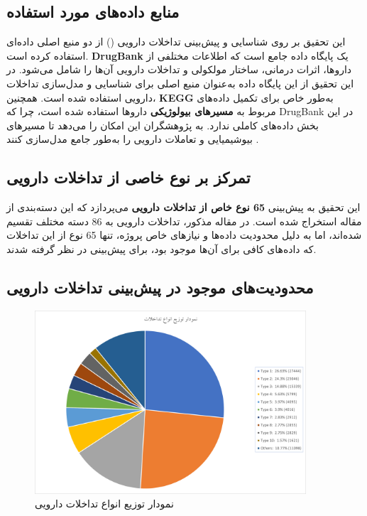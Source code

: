 \subsection{منابع داده‌های مورد استفاده}
این تحقیق بر روی شناسایی و پیش‌بینی تداخلات دارویی () از دو منبع اصلی داده‌ای استفاده کرده است. \textbf{DrugBank} یک پایگاه داده جامع است که اطلاعات مختلفی از داروها، اثرات درمانی، ساختار مولکولی و تداخلات دارویی آن‌ها را شامل می‌شود. در این تحقیق از این پایگاه داده به‌عنوان منبع اصلی برای شناسایی و مدل‌سازی تداخلات دارویی استفاده شده است. همچنین، \textbf{KEGG} به‌طور خاص برای تکمیل داده‌های مربوط به \textbf{مسیرهای بیولوژیکی} داروها استفاده شده است، چرا که DrugBank در این بخش داده‌های کاملی ندارد.  به پژوهشگران این امکان را می‌دهد تا مسیرهای بیوشیمیایی و تعاملات دارویی را به‌طور جامع مدل‌سازی کنند \cite{ref_drugbank, ref_kegg}.

\subsection{تمرکز بر نوع خاصی از تداخلات دارویی}
این تحقیق به پیش‌بینی \textbf{65 نوع خاص از تداخلات دارویی} می‌پردازد که این دسته‌بندی از مقاله \cite{ref_ryu2018} استخراج شده‌ است. در مقاله مذکور، تداخلات دارویی به 86 دسته مختلف تقسیم شده‌اند، اما به دلیل محدودیت داده‌ها و نیازهای خاص پروژه، تنها 65 نوع از این تداخلات که داده‌های کافی برای آن‌ها موجود بود، برای پیش‌بینی در نظر گرفته شدند.

\subsection{محدودیت‌های موجود در پیش‌بینی تداخلات دارویی}

\begin{figure}[t]
	\centering
	\includegraphics[width=0.9\textwidth]{images/image1-1.png}
	\caption{ نمودار توزیع انواع تداخلات دارویی }
	\label{image1-1}
	\centering
\end{figure}

